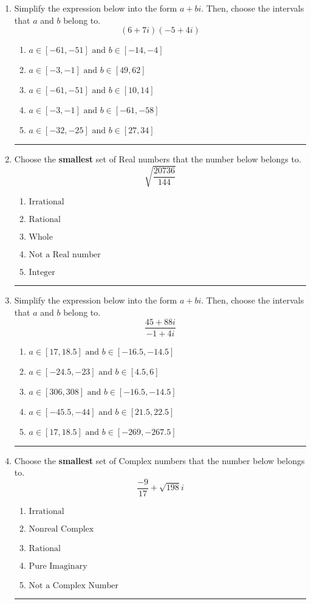 \documentclass[14pt]{extbook}
\newcommand{\litem}[1]{\item#1\hspace*{-1cm}\rule{\textwidth}{0.4pt}}
\begin{document}
\begin{enumerate}
{\begin{enumerate}[label=\Alph*.]
\end{enumerate} }
\litem{
Simplify the expression below into the form $a+bi$. Then, choose the intervals that $a$ and $b$ belong to.\[ (6 + 7 i)(-5 + 4 i) \]\begin{enumerate}[label=\Alph*.]
\item \( a \in [-61, -51] \text{ and } b \in [-14, -4] \)
\item \( a \in [-3, -1] \text{ and } b \in [49, 62] \)
\item \( a \in [-61, -51] \text{ and } b \in [10, 14] \)
\item \( a \in [-3, -1] \text{ and } b \in [-61, -58] \)
\item \( a \in [-32, -25] \text{ and } b \in [27, 34] \)

\end{enumerate} }
\litem{
Choose the \textbf{smallest} set of Real numbers that the number below belongs to.\[ \sqrt{\frac{20736}{144}} \]\begin{enumerate}[label=\Alph*.]
\item \( \text{Irrational} \)
\item \( \text{Rational} \)
\item \( \text{Whole} \)
\item \( \text{Not a Real number} \)
\item \( \text{Integer} \)

\end{enumerate} }
\litem{
Simplify the expression below into the form $a+bi$. Then, choose the intervals that $a$ and $b$ belong to.\[ \frac{45 + 88 i}{-1 + 4 i} \]\begin{enumerate}[label=\Alph*.]
\item \( a \in [17, 18.5] \text{ and } b \in [-16.5, -14.5] \)
\item \( a \in [-24.5, -23] \text{ and } b \in [4.5, 6] \)
\item \( a \in [306, 308] \text{ and } b \in [-16.5, -14.5] \)
\item \( a \in [-45.5, -44] \text{ and } b \in [21.5, 22.5] \)
\item \( a \in [17, 18.5] \text{ and } b \in [-269, -267.5] \)

\end{enumerate} }
\litem{
Choose the \textbf{smallest} set of Complex numbers that the number below belongs to.\[ \frac{-9}{17}+\sqrt{198} i \]\begin{enumerate}[label=\Alph*.]
\item \( \text{Irrational} \)
\item \( \text{Nonreal Complex} \)
\item \( \text{Rational} \)
\item \( \text{Pure Imaginary} \)
\item \( \text{Not a Complex Number} \)


\end{enumerate}}
\end{enumerate}
\end{document}

